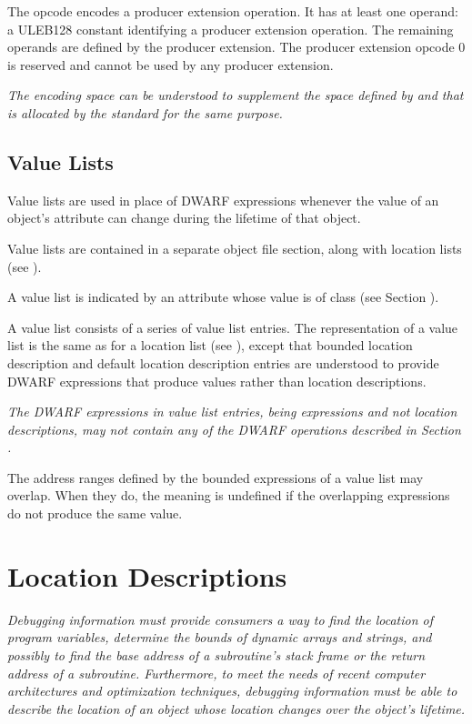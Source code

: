 \begin{enumerate}[1. ]
\bb
\itembfnl{\DWOPuserextendedTARG}
The \DWOPuserextendedNAME{} opcode encodes a 
\bb
producer
\eb
extension operation. 
It has at least one operand: a ULEB128 constant identifying a 
\bb
producer 
\eb
extension operation. The remaining operands are defined by the 
\bb
producer 
\eb
extension. The 
\bb
producer 
\eb
extension opcode 0 is reserved and cannot be used by any
\bb
producer 
\eb
extension.

\textit{The \DWOPuserextended{} encoding space can be understood to supplement 
the space defined by \DWOPlouser{} and \DWOPhiuser{} that is allocated by
the standard for the same purpose.}
\eb

\end{enumerate}

\bb
\subsection{Value Lists}
\label{chap:valuelists}
Value lists are used in place of 
DWARF expressions whenever the value of an object's attribute 
can change during the lifetime of that object.

Value lists are contained in a separate object file section, 
along with location lists (see ).

A value list is indicated by an attribute whose value is of class 
\label{chap:classvallist}\CLASSvallist{} (see Section ).

A value list consists of a series of value list entries. 
The representation of a value list is the same as for a 
location list (see ), except 
that bounded location description and default location description 
entries are understood to provide DWARF expressions that produce 
values rather than location descriptions.

\textit{The DWARF expressions in value list entries, being 
expressions and not location descriptions, may not contain 
any of the DWARF operations described in Section 
.}

The address ranges defined by the bounded expressions of a 
value list may overlap. When they do, the meaning is undefined 
if the overlapping expressions do not produce the same value.
\eb

\section{Location Descriptions}
\label{chap:locationdescriptions}
\textit{Debugging information 
must 
provide consumers a way to find
the location of program variables, determine the bounds
of dynamic arrays and strings, and possibly to find the
base address of a subroutine\textquoteright s stack frame or the return
address of a subroutine. Furthermore, to meet the needs of
recent computer architectures and optimization techniques,
debugging information must be able to describe the location of
an object whose location changes over the object\textquoteright s lifetime.}

